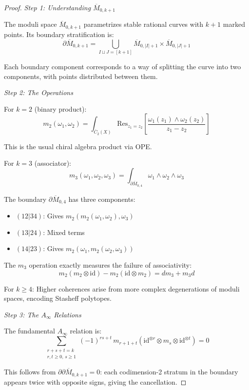 \begin{proof}
\emph{Step 1: Understanding $\overline{M}_{0,k+1}$}

The moduli space $\overline{M}_{0,k+1}$ parametrizes stable rational curves with 
$k+1$ marked points. Its boundary stratification is:
\[\partial \overline{M}_{0,k+1} = \bigcup_{I \sqcup J = [k+1]} 
\overline{M}_{0,|I|+1} \times \overline{M}_{0,|J|+1}\]

Each boundary component corresponds to a way of splitting the curve into two 
components, with points distributed between them.

\emph{Step 2: The Operations}

For $k=2$ (binary product):
\[m_2(\omega_1, \omega_2) = \int_{\overline{C}_2(X)} 
\text{Res}_{z_1=z_2}\left[\frac{\omega_1(z_1) \wedge \omega_2(z_2)}{z_1-z_2}\right]\]

This is the usual chiral algebra product via OPE.

For $k=3$ (associator):
\[m_3(\omega_1, \omega_2, \omega_3) = 
\int_{\partial \overline{M}_{0,4}} \omega_1 \wedge \omega_2 \wedge \omega_3\]

The boundary $\partial \overline{M}_{0,4}$ has three components:
\begin{itemize}
\item $(12|34)$: Gives $m_2(m_2(\omega_1,\omega_2),\omega_3)$
\item $(13|24)$: Mixed terms
\item $(14|23)$: Gives $m_2(\omega_1,m_2(\omega_2,\omega_3))$
\end{itemize}

The $m_3$ operation exactly measures the failure of associativity:
\[m_2(m_2 \otimes \text{id}) - m_2(\text{id} \otimes m_2) = d m_3 + m_3 d\]

For $k \geq 4$: Higher coherences arise from more complex degenerations of moduli 
spaces, encoding Stasheff polytopes.

\emph{Step 3: The $A_\infty$ Relations}

The fundamental $A_\infty$ relation is:
\[\sum_{\substack{r+s+t=k \\ r,t \geq 0,\, s \geq 1}} (-1)^{rs+t}\,
m_{r+1+t}(\mathrm{id}^{\otimes r} \otimes m_s \otimes \mathrm{id}^{\otimes t}) = 0\]

This follows from $\partial \partial \overline{M}_{0,k+1} = 0$: each codimension-2 
stratum in the boundary appears twice with opposite signs, giving the cancellation.
\end{proof}

